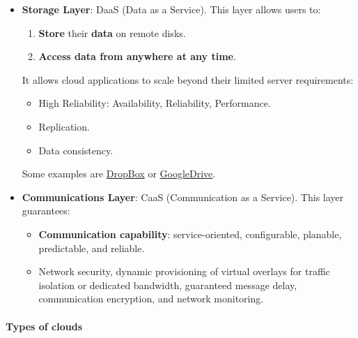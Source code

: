 \begin{itemize}
\begin{itemize}
		
		\item \textbf{Storage Layer}: DaaS (Data as a Service). This layer allows users to:
		\begin{enumerate}
			\item \textbf{Store} their \textbf{data} on remote disks.
			\item \textbf{Access data from anywhere at any time}.
		\end{enumerate}
		It allows cloud applications to scale beyond their limited server requirements:
		\begin{itemize}
			\item High Reliability: Availability, Reliability, Performance.
			\item Replication.
			\item Data consistency.
		\end{itemize}
		
		Some examples are \href{https://www.dropbox.com/explore-homepage?v=v5}{DropBox} or \href{https://www.google.it/intl/en/drive/}{GoogleDrive}.
		
		
		\item \textbf{Communications Layer}: CaaS (Communication as a Service). This layer guarantees:
		\begin{itemize}
			\item \textbf{Communication capability}: service-oriented, configurable, planable, predictable, and reliable.
			
			\item Network security, dynamic provisioning of virtual overlays for traffic isolation or dedicated bandwidth, guaranteed message delay, communication encryption, and network monitoring.
		\end{itemize}
	\end{itemize}
\end{itemize}

\newpage

\paragraph{Types of clouds}

